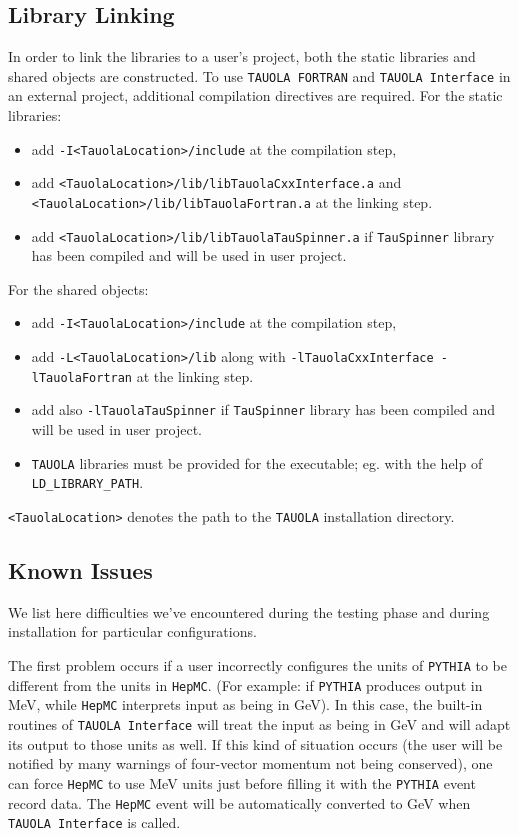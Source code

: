 \documentclass[]{Tauola_interface_design}
\begin{document}
\subsection{Library Linking}
In order to link the libraries to a user's project, both the static libraries and shared objects are
constructed. To use {\tt TAUOLA FORTRAN} and {\tt TAUOLA Interface} in an external project, additional 
compilation directives are required. For the static libraries:
\begin{itemize}
  \item add {\tt -I<TauolaLocation>/include} at the compilation step,
  \item add {\tt <TauolaLocation>/lib/libTauolaCxxInterface.a} and \\ {\tt <TauolaLocation>/lib/libTauolaFortran.a} at the linking step.
  \item add {\tt <TauolaLocation>/lib/libTauolaTauSpinner.a} if {\tt TauSpinner} library has been compiled and will be used in user project.
\end{itemize}
For the shared objects:
\begin{itemize}
  \item add {\tt -I<TauolaLocation>/include} at the compilation step,
  \item add {\tt -L<TauolaLocation>/lib} along with {\tt -lTauolaCxxInterface -lTauolaFortran} at the linking step.
  \item add also {\tt -lTauolaTauSpinner} if {\tt TauSpinner} library has been compiled and will be used in user project.
  \item  {\tt TAUOLA} libraries must be provided for the executable; eg. with the help of  {\tt LD\_LIBRARY\_PATH}.
\end{itemize}
{\tt <TauolaLocation>} denotes the  path to the {\tt TAUOLA} installation directory. 



\subsection{ Known Issues}
\label{subs:Issues}

We list  here difficulties  we've encountered during the testing phase and during 
installation for particular configurations.

The first problem occurs if a user incorrectly configures the units of
{\tt PYTHIA} to be different from the units in {\tt HepMC}. (For
example: if {\tt PYTHIA} produces output in MeV, while {\tt HepMC}
interprets input as being in GeV).  In this case, the
built-in routines of {\tt TAUOLA Interface} will treat the input as being in
GeV and will adapt its output to those units as well.  If this kind of
situation occurs (the user will be notified by many warnings of
four-vector momentum not being conserved), one can force {\tt HepMC}
to use MeV units just before filling it with the {\tt PYTHIA} event record
data. The {\tt HepMC} event will be automatically converted to GeV
when {\tt TAUOLA Interface} is called.
\end{document}
